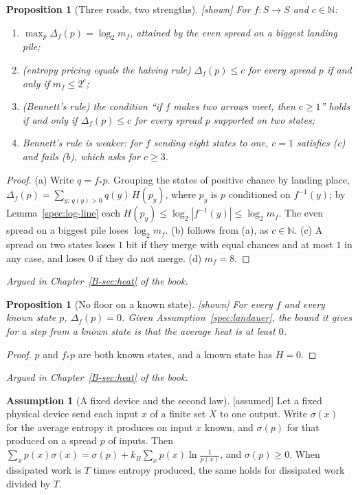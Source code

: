 \documentclass[11pt, a4paper]{article}
\theoremstyle{plain}
\newtheorem{proposition}[theorem]{Proposition}
\theoremstyle{definition}
\newtheorem{assumption}[theorem]{Assumption}
\theoremstyle{remark}
\newcommand{\N}{\mathbb{N}}
\newcommand{\inv}{^{-1}}
\newcommand{\argued}[1]{\par\noindent\textit{Argued in Chapter~\ref{B-#1} of the book.}\par}
\newcommand{\kind}[1]{\textup{[#1]}}
\begin{document}
\begin{proposition}[Three roads, two strengths]\label{spec:three-roads} \kind{shown}
For $f:S\to S$ and $c\in\N$:
\begin{enumerate}[label=(\alph*)]
\item $\max_p\Delta_f(p)=\log_2 m_f$, attained by the even spread on a biggest landing pile;
\item (entropy pricing equals the halving rule) $\Delta_f(p)\le c$ for every spread $p$ if and only if
$m_f\le2^c$;
\item (Bennett's rule) the condition ``if $f$ makes two arrows meet, then $c\ge1$'' holds if and only if
$\Delta_f(p)\le c$ for every spread $p$ supported on two states;
\item Bennett's rule is weaker: for $f$ sending eight states to one, $c=1$ satisfies (c) and fails (b),
which asks for $c\ge3$.
\end{enumerate}
\end{proposition}

\begin{proof}
(a) Write $q=f_*p$. Grouping the states of positive chance by landing place,
$\Delta_f(p)=\sum_{y:\,q(y)>0}q(y)\,H(p_y)$, where $p_y$ is $p$ conditioned on $f\inv(y)$; by
Lemma~\ref{spec:log-line} each $H(p_y)\le\log_2|f\inv(y)|\le\log_2m_f$. The even spread on a biggest pile
loses $\log_2 m_f$. (b) follows from (a), as $c\in\N$. (c) A spread on two states loses $1$ bit if they merge
with equal chances and at most $1$ in any case, and loses $0$ if they do not merge. (d) $m_f=8$.
\end{proof}

\argued{sec:heat}

\begin{proposition}[No floor on a known state]\label{spec:known-state} \kind{shown}
For every $f$ and every known state $p$, $\Delta_f(p)=0$. Given Assumption~\ref{spec:landauer}, the bound
it gives for a step from a known state is that the average heat is at least $0$.
\end{proposition}

\begin{proof}
$p$ and $f_*p$ are both known states, and a known state has $H=0$.
\end{proof}

\argued{sec:heat}

\begin{assumption}[A fixed device and the second law]\label{spec:device-identity} \kind{assumed}
Let a fixed physical device send each input $x$ of a finite set $X$ to one output. Write $\sigma(x)$ for the
average entropy it produces on input $x$ known, and $\sigma(p)$ for that produced on a spread $p$ of inputs.
Then $\sum_x p(x)\sigma(x)=\sigma(p)+k_B\sum_x p(x)\ln\frac1{p(x)}$, and $\sigma(p)\ge0$. When dissipated work
is $T$ times entropy produced, the same holds for dissipated work divided by $T$.
\end{assumption}
\end{document}
